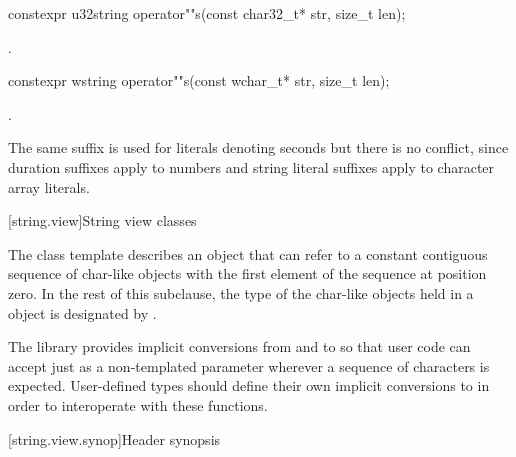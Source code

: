 %
\begin{itemdecl}
constexpr u32string operator""s(const char32_t* str, size_t len);
\end{itemdecl}
\begin{itemdescr}
\pnum
\returns
{}.
\end{itemdescr}

%
\begin{itemdecl}
constexpr wstring operator""s(const wchar_t* str, size_t len);
\end{itemdecl}
\begin{itemdescr}
\pnum
\returns
{}.
\end{itemdescr}

\pnum
\begin{note}
The same suffix  is used for  literals denoting seconds but there is no conflict, since duration suffixes apply to numbers and string literal suffixes apply to character array literals.
\end{note}

[string.view]{String view classes}

\pnum
The class template  describes an object that can refer to a constant contiguous sequence of char-like objects with the first element of the sequence at position zero.
In the rest of this subclause, the type of the char-like objects held in a  object is designated by .

\pnum
\begin{note}
The library provides implicit conversions from  and  to  so that user code can accept just  as a non-templated parameter wherever a sequence of characters is expected.
User-defined types should define their own implicit conversions to  in order to interoperate with these functions.
\end{note}

[string.view.synop]{Header  synopsis}

